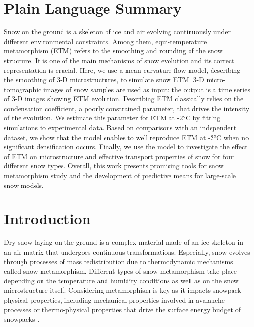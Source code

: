 \documentclass[draft,ms]{agujournal2019}
\begin{document}
\section*{Plain Language Summary}

Snow on the ground is a skeleton of ice and air evolving continuously under different environmental constraints. Among them, equi-temperature metamorphism (ETM) refers to the smoothing and rounding of the snow structure. It is one of the main mechanisms of snow evolution and its correct representation is crucial. Here, we use a mean curvature flow model, describing the smoothing of 3-D microstructures, to simulate snow ETM. 3-D micro-tomographic images of snow samples are used as input; the output is a time series of 3-D images showing ETM evolution. Describing ETM classically relies on the condensation coefficient, a poorly constrained parameter, that drives the intensity of the evolution. We estimate this parameter for ETM at -2°C by fitting simulations to experimental data. Based on comparisons with an independent dataset, we show that the model enables to well reproduce ETM at -2°C when no significant densification occurs. Finally, we use the model to investigate the effect of ETM on microstructure and effective transport properties of snow for four different snow types. Overall, this work presents promising tools for snow metamorphism study and the development of predictive means for large-scale snow models.

\section{Introduction}
\label{sec:intro}
Dry snow laying on the ground is a complex material made of an ice skeleton in an air matrix that undergoes continuous transformations. Especially, snow evolves through processes of mass redistribution due to thermodynamic mechanisms called snow metamorphism. Different types of snow metamorphism take place depending on the temperature and humidity conditions as well as on the snow microstructure itself. Considering metamorphism is key as it impacts snowpack physical properties, including mechanical properties involved in avalanche processes or thermo-physical properties that drive the surface energy budget of snowpacks \cite{lehning_physical_2002, vionnet_detailed_2012}.\\
\end{document}
